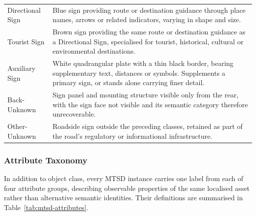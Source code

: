 \begin{table}[H]
\begin{tabularx}{\textwidth}{@{}p{3.8cm} X@{}}
    \addlinespace[0.5em]

    Directional Sign
    & Blue sign providing route or destination guidance through place names, arrows or related indicators, varying in shape and size. \\

    \addlinespace[0.5em]

    Tourist Sign
    & Brown sign providing the same route or destination guidance as a Directional Sign, specialised for tourist, historical, cultural or environmental destinations. \\

    \addlinespace[0.5em]

    Auxiliary Sign
    & White quadrangular plate with a thin black border, bearing supplementary text, distances or symbols. Supplements a primary sign, or stands alone carrying finer detail. \\

\midrule

    Back-Unknown
    & Sign panel and mounting structure visible only from the rear, with the sign face not visible and its semantic category therefore unrecoverable. \\

    \addlinespace[0.5em]

    Other-Unknown
    & Roadside sign outside the preceding classes, retained as part of the road's regulatory or informational infrastructure. \\
\bottomrule
\end{tabularx}
\end{table}

\subsubsection{Attribute Taxonomy}
\label{sec:bg-attributes}
In addition to object class, every \gls{MTSD} instance carries one label from each of four attribute groups, describing observable properties of the same localised asset rather than alternative semantic identities. Their definitions are summarised in Table~\ref{tab:mtsd-attributes}.

